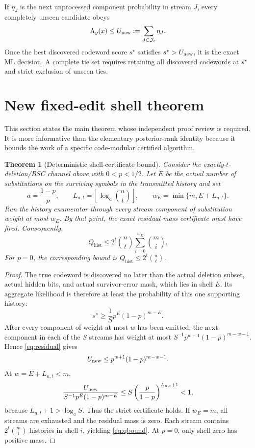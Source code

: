 \documentclass[11pt]{article}
\newtheorem{theorem}{Theorem}
\theoremstyle{definition}
\theoremstyle{remark}
\newcommand{\Qhist}{Q_{\mathrm{hist}}}
\begin{document}
If $\eta_J$ is the next unprocessed component probability in stream $J$, every completely unseen candidate obeys
\begin{equation}
  \Lambda_y(x)\le U_{\rm new}:=\sum_{J\in\mathcal J_t}\eta_J.
  \label{eq:residual}
\end{equation}
Once the best discovered codeword score $s^\star$ satisfies $s^\star>U_{\rm new}$, it is the exact ML decision.  A complete tie set requires retaining all discovered codewords at $s^\star$ and strict exclusion of unseen ties.

\section{New fixed-edit shell theorem}
This section states the main theorem whose independent proof review is required.  It is more informative than the elementary posterior-rank identity because it bounds the work of a specific code-modular certified algorithm.

\begin{theorem}[Deterministic shell-certificate bound]
\label{thm:shell}
Consider the exactly-$t$-deletion/BSC channel above with $0<p<1/2$.  Let $E$ be the actual number of substitutions on the surviving symbols in the transmitted history and set
\[
  a=\frac{1-p}{p},\qquad
  L_{n,t}=\left\lfloor\log_a\binom nt\right\rfloor,
  \qquad
  w_E=\min\{m,E+L_{n,t}\}.
\]
Run the history enumerator through every stream component of substitution weight at most $w_E$.  By that point, the exact residual-mass certificate must have fired.  Consequently,
\begin{equation}
  \Qhist
  \le
  2^t\binom nt\sum_{i=0}^{w_E}\binom mi.
  \label{eq:qbound}
\end{equation}
For $p=0$, the corresponding bound is $\Qhist\le 2^t\binom nt$.
\end{theorem}

\begin{proof}
The true codeword is discovered no later than the actual deletion subset, actual hidden bits, and actual survivor-error mask, which lies in shell $E$.  Its aggregate likelihood is therefore at least the probability of this one supporting history:
\[
  s^\star\ge \frac1S p^E(1-p)^{m-E}.
\]
After every component of weight at most $w$ has been emitted, the next component in each of the $S$ streams has weight at most $S^{-1}p^{w+1}(1-p)^{m-w-1}$.  Hence \eqref{eq:residual} gives
\[
 U_{\rm new}\le p^{w+1}(1-p)^{m-w-1}.
\]
At $w=E+L_{n,t}<m$,
\[
 \frac{U_{\rm new}}{S^{-1}p^E(1-p)^{m-E}}
 \le
 S\left(\frac{p}{1-p}\right)^{L_{n,t}+1}<1,
\]
because $L_{n,t}+1>\log_a S$.  Thus the strict certificate holds.  If $w_E=m$, all streams are exhausted and the residual mass is zero.  Each stream contains $2^t\binom mi$ histories in shell $i$, yielding \eqref{eq:qbound}.  At $p=0$, only shell zero has positive mass.
\end{proof}
\end{document}

